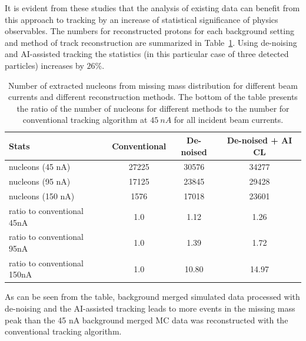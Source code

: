 It is evident from these studies that the analysis of existing data can benefit from this approach to tracking by an increase 
of statistical significance of physics observables. The numbers for reconstructed protons for each background setting 
and method of track reconstruction are summarized in Table~\ref{table:summary}. Using de-noising and AI-assisted 
tracking the statistics (in this particular case of three detected particles) increases by $26\%$. 

\begin{table}
\begin{center}
\begin{tabular}{l|ccc}
Stats & Conventional & De-noised & De-noised + AI CL \\
\hline
 nucleons (45 nA)  & 27225 &  30576 & 34277 \\
 nucleons (95 nA)  & 17125 & 23845 & 29428 \\
 nucleons (150 nA) &  1576 & 17018 & 23601 \\
\hline
\hline
ratio to conventional 45nA & 1.0 & 1.12 & 1.26 \\
ratio to conventional 95nA & 1.0 & 1.39 & 1.72 \\
ratio to conventional 150nA & 1.0 & 10.80 & 14.97 \\
\end{tabular}
\end{center}
\caption{Number of extracted nucleons from missing mass distribution for different beam currents
and different reconstruction methods. The bottom of the table presents the ratio of the number of nucleons for
different methods to the number for conventional tracking algorithm at $45~nA$ for all incident beam currents.}
 \label{table:summary}
\end{table}

As can be seen from the table, background merged simulated data processed with de-noising and the
 AI-assisted tracking leads to more events in the missing mass peak than the 45 nA background merged 
 MC data was reconstructed with the conventional tracking algorithm.
 
